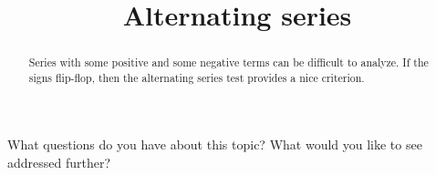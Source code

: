\documentclass{ximera}
\title{Alternating series}
\begin{document}
\begin{abstract}
  Series with some positive and some negative terms can be difficult to analyze.  If the signs flip-flop, then the alternating series test provides a nice criterion.
\end{abstract}

\maketitle



What questions do you have about this topic?  What would you like to see addressed further?
\begin{free-response}
\end{free-response}
\end{document}
